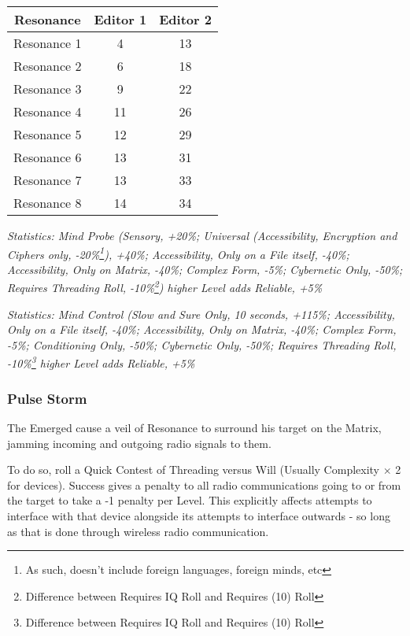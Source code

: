 \begin{multicols*}{3}
	\begin{center}
		\begin{tabular}{|c|c|c|}
			\hline
			Resonance & Editor 1 & Editor 2 \\
			\hline
			\hline
			Resonance 1 & 4 & 13 \\
			Resonance 2 & 6 & 18 \\
			Resonance 3 & 9 & 22 \\
			Resonance 4 & 11 & 26 \\
			Resonance 5 & 12 & 29 \\
			Resonance 6 & 13 & 31 \\
			Resonance 7 & 13 & 33 \\
			Resonance 8 & 14 & 34 \\
			\hline
		\end{tabular}
	\end{center}
	
	\textcolor{OliveGreen}{\textit{Statistics: Mind Probe (Sensory, +20\%; Universal (Accessibility, Encryption and Ciphers only, -20\%\footnote{As such, doesn't include foreign languages, foreign minds, etc}), +40\%; Accessibility, Only on a File itself, -40\%; Accessibility, Only on Matrix, -40\%; Complex Form, -5\%; Cybernetic Only, -50\%; Requires Threading Roll, -10\%\footnote{Difference between Requires IQ Roll and Requires (10) Roll}) higher Level adds Reliable, +5\%}}
			
	\textcolor{OliveGreen}{\textit{Statistics: Mind Control (Slow and Sure Only, 10 seconds, +115\%; Accessibility, Only on a File itself, -40\%; Accessibility, Only on Matrix, -40\%; Complex Form, -5\%; Conditioning Only, -50\%; Cybernetic Only, -50\%; Requires Threading Roll, -10\%\footnote{Difference between Requires IQ Roll and Requires (10) Roll} higher Level adds Reliable, +5\%}}
	
	\subsubsection*{Pulse Storm}\label{pulse_storm}
	
	The Emerged cause a veil of Resonance to surround his target on the Matrix, jamming incoming and outgoing radio signals to them.
	
	To do so, roll a Quick Contest of Threading versus Will (Usually Complexity $\times$ 2 for devices). Success gives a penalty to all radio communications going to or from the target to take a -1 penalty per Level. This explicitly affects attempts to interface with that device alongside its attempts to interface outwards - so long as that is done through wireless radio communication.
	

\end{multicols*}
